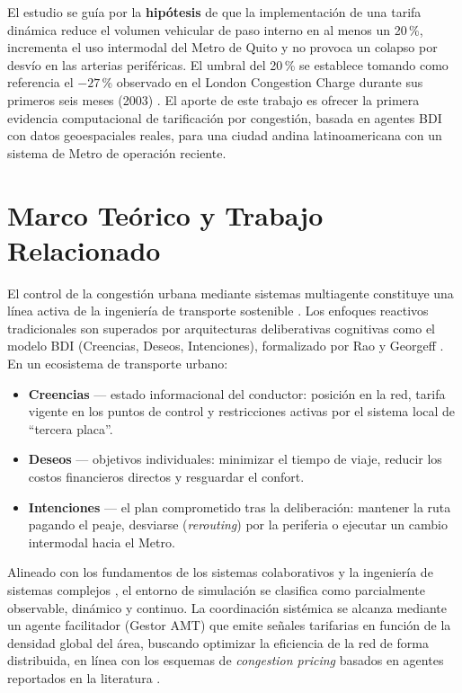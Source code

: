 \documentclass[twocolumn,10pt]{article}
\begin{document}
El estudio se gu\'ia por la \textbf{hip\'otesis} de que la implementaci\'on de una tarifa
din\'amica reduce el volumen vehicular de paso interno en al menos un 20\,\%, incrementa
el uso intermodal del Metro de Quito y no provoca un colapso por desv\'io en las arterias
perif\'ericas. El umbral del 20\,\% se establece tomando como referencia el $-27$\,\%
observado en el London Congestion Charge durante sus primeros seis meses (2003)
\cite{london2020,london2024}. El aporte de este trabajo es ofrecer la primera evidencia
computacional de tarificaci\'on por congesti\'on, basada en agentes BDI con datos
geoespaciales reales, para una ciudad andina latinoamericana con un sistema de Metro de
operaci\'on reciente.

\section{Marco Te\'orico y Trabajo Relacionado}
El control de la congesti\'on urbana mediante sistemas multiagente constituye una
l\'inea activa de la ingenier\'ia de transporte sostenible \cite{gama2023,etrr2023}. Los
enfoques reactivos tradicionales son superados por arquitecturas deliberativas
cognitivas como el modelo BDI (Creencias, Deseos, Intenciones), formalizado por Rao y
Georgeff \cite{raoGeorgeff1995}. En un ecosistema de transporte urbano:

\begin{itemize}[leftmargin=1.3em,itemsep=2pt,topsep=2pt]
  \item \textbf{Creencias} --- estado informacional del conductor: posici\'on en la red,
        tarifa vigente en los puntos de control y restricciones activas por el sistema
        local de ``tercera placa''.
  \item \textbf{Deseos} --- objetivos individuales: minimizar el tiempo de viaje, reducir
        los costos financieros directos y resguardar el confort.
  \item \textbf{Intenciones} --- el plan comprometido tras la deliberaci\'on: mantener la
        ruta pagando el peaje, desviarse (\textit{rerouting}) por la periferia o ejecutar
        un cambio intermodal hacia el Metro.
\end{itemize}

Alineado con los fundamentos de los sistemas colaborativos y la ingenier\'ia de sistemas
complejos \cite{gomez2013}, el entorno de simulaci\'on se clasifica como parcialmente
observable, din\'amico y continuo. La coordinaci\'on sist\'emica se alcanza mediante un
agente facilitador (Gestor AMT) que emite se\~nales tarifarias en funci\'on de la
densidad global del \'area, buscando optimizar la eficiencia de la red de forma
distribuida, en l\'inea con los esquemas de \textit{congestion pricing} basados en
agentes reportados en la literatura \cite{magtToll2024,kaddoura2019}.
\end{document}
